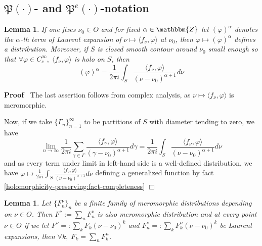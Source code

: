 \documentclass{article}
\newcommand{\assign}{:=}
\renewenvironment{proof}{\noindent\textbf{Proof\ }}{\hspace*{\fill}$\Box$\medskip}
\newtheorem{lemma}[proposition]{Lemma}
\theoremstyle{remark}
\begin{document}
\subsection{$\mathfrak{P} (\cdot)$- and $\mathfrak{P}^e (\cdot)$-notation}

\begin{lemma}
  \label{P-def:lem-laurent-distr}If one fixes $\nu_0 \in O$ and for fixed
  $\alpha \in \mathbbm{Z}^{}$ let $(\varphi)^{\alpha}$ denotes the $\alpha$-th
  term of Laurent expansion of $\nu \mapsto \langle f_{\nu}, \varphi \rangle$
  at $\nu_0$, then $\varphi \mapsto (\varphi)^{\alpha}$ defines a
  distribution. Moreover, if $S$ is closed smooth contour around $\nu_0$ small
  enough so that $\forall \varphi \in C^{\infty}_c, \; \langle f_{\nu},
  \varphi \rangle$ is holo on $S$, then
  \[ (\varphi)^{\alpha} = \frac{1}{2 \pi i} \int_S \frac{\langle f_{\nu},
     \varphi \rangle}{(\nu - \nu_0)^{\alpha + 1}} d \nu \]
\end{lemma}

\begin{proof}
  The last assertion follows from complex analysis, as $\nu \mapsto \langle
  f_{\nu}, \varphi \rangle$ is meromorphic.
  
  Now, if we take $\{ \Gamma_n \}_{n = 1}^{\infty}$ to be partitions of $S$
  with diameter tending to zero, we have
  \[ \lim_{n \rightarrow \infty} \frac{1}{2 \pi i} \sum_{\gamma \in \Gamma}
     \frac{\langle f_{\gamma}, \varphi \rangle}{(\gamma - \nu_0)^{\alpha + 1}}
     d \gamma = \frac{1}{2 \pi i} \int_S \frac{\langle f_{\nu}, \varphi
     \rangle}{(\nu - \nu_0)^{\alpha + 1}} d \nu \]
  and as every term under limit in left-hand side is a well-defined
  distribution, we have $\varphi \mapsto \frac{1}{2 \pi i} \int_S
  \frac{\langle f_{\nu}, \varphi \rangle}{(\nu - \nu_0)^{\alpha + 1}} d \nu$
  defining a generalized function by fact
  \ref{holomorphicity-preserving:fact-completeness}
\end{proof}

\begin{lemma}
  \label{P-def:lem-mero-addition}Let $\{ F_n^{\nu} \}_n$ be a finite family of
  meromorphic distributions depending on $\nu \in O$. Then $F^{\nu} \assign
  \sum_n F_n^{\nu}$ is also meromorphic distribution and at every point $\nu
  \in O$ if we let $F^{\nu} = : \sum_k F_k^{} (\nu - \nu_0)^k$ and $F^{\nu}_n
  = : \sum_k F^n_k (\nu - \nu_0)^k$ be Laurent expansions, then $\forall k, \;
  F_k = \sum_n F_k^n$.
\end{lemma}
\end{document}
